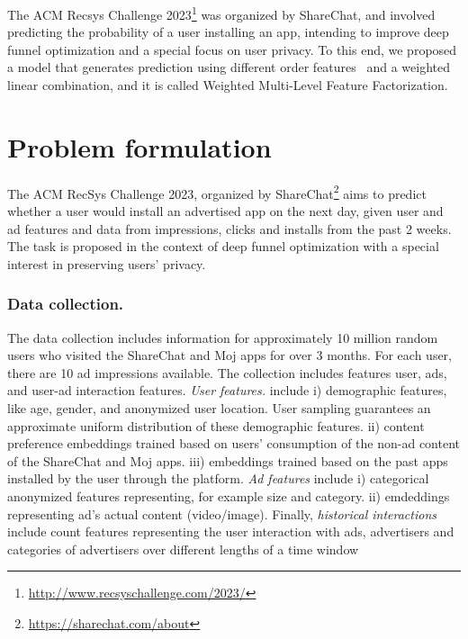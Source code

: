 \documentclass[manuscript,nonacm]{acmart}
\begin{document}
The ACM Recsys Challenge 2023\footnote{\url{http://www.recsyschallenge.com/2023/}} was organized by ShareChat, and involved predicting the probability of a user installing an app, intending to improve deep funnel optimization and a special focus on user privacy. To this end, we proposed a model that generates prediction using different order features~\cite{wdlrs16, deepfm17} and 
 a weighted linear combination, and it is called Weighted Multi-Level Feature Factorization.







\section{Problem formulation}\label{sec:problem}

The ACM RecSys Challenge 2023, organized by ShareChat\footnote{\url{ https://sharechat.com/about}} aims to predict whether a user would install an advertised app on the next day, given user and ad features and data from impressions, clicks and installs from the past 2 weeks. 
The task is proposed in the context of deep funnel optimization with a special interest in preserving users’ privacy. 

\subsubsection*{\textbf{Data collection.}}\hfill

The data collection includes information for approximately 10 million random users who visited the ShareChat and Moj apps for over 3 months. For each user, there are 10 ad impressions available. The collection includes features user, ads, and user-ad interaction features. \textit{User features.} include i) demographic features, like age, gender, and anonymized user location. User sampling guarantees an approximate uniform distribution of these demographic features. ii) content preference embeddings trained based on users’ consumption of the non-ad content of the ShareChat and Moj apps. iii) embeddings trained based on the past apps installed by the user through the platform.
\textit{Ad features} include i) categorical anonymized features representing, for example size and category. ii) emdeddings representing ad's  actual content (video/image). Finally, \textit{historical interactions} include count features representing the user interaction with ads, advertisers and categories of advertisers over different lengths of a time window
\end{document}
